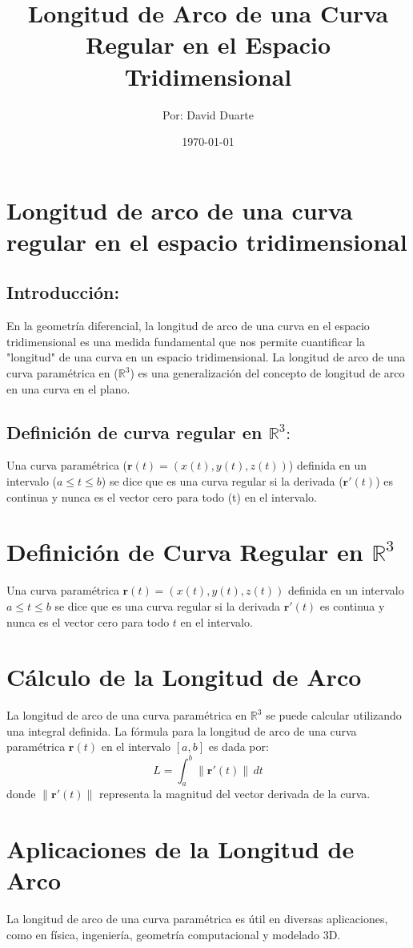 \documentclass{article}
\title{Longitud de Arco de una Curva Regular en el Espacio Tridimensional}
\author{Por: David Duarte}
\date{\today}
\begin{document}
	
	\maketitle
	
	\section{Longitud de arco de una curva regular en el espacio tridimensional}

\subsection {Introducción:}

En la geometría diferencial, la longitud de arco de una curva en el espacio tridimensional es una medida fundamental que nos permite cuantificar la "longitud" de una curva en un espacio tridimensional.
La longitud de arco de una curva paramétrica en ($\mathbb{R}^3$) es una generalización del concepto de longitud de arco en una curva en el plano.

\subsection{Definición de curva regular en $\mathbb{R}^3:$}

Una curva paramétrica ($\mathbf{r}(t) = (x(t), y(t), z(t))$) definida en un intervalo ($a \leq t \leq b$) se dice que es una curva regular si la derivada ($\mathbf{r}'(t)$) es continua y nunca es el vector cero para todo (t) en el intervalo.
	
	\section{Definición de Curva Regular en $\mathbb{R}^3$}
	Una curva paramétrica $\mathbf{r}(t) = (x(t), y(t), z(t))$ definida en un intervalo $a \leq t \leq b$ se dice que es una curva regular si la derivada $\mathbf{r}'(t)$ es continua y nunca es el vector cero para todo $t$ en el intervalo.
	
	\section{Cálculo de la Longitud de Arco}
	La longitud de arco de una curva paramétrica en $\mathbb{R}^3$ se puede calcular utilizando una integral definida. La fórmula para la longitud de arco de una curva paramétrica $\mathbf{r}(t)$ en el intervalo $[a, b]$ es dada por:
	\[ L = \int_{a}^{b} \| \mathbf{r}'(t) \| \, dt \]
	donde $\| \mathbf{r}'(t) \|$ representa la magnitud del vector derivada de la curva.
	
	\section{Aplicaciones de la Longitud de Arco}
	La longitud de arco de una curva paramétrica es útil en diversas aplicaciones, como en física, ingeniería, geometría computacional y modelado 3D.
	

	
\end{document}
